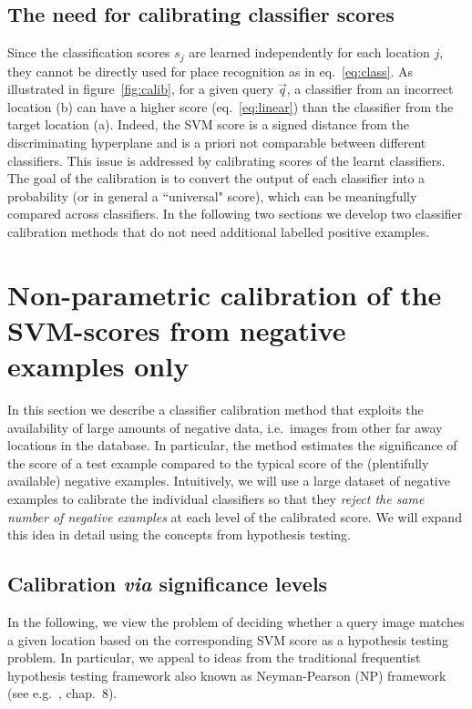   \subsection{The need for calibrating classifier scores}
    Since the classification scores $s_j$ are learned independently for each location $j$, they cannot be directly used for place recognition as in eq.~\eqref{eq:class}. As illustrated in figure~\ref{fig:calib}, for a given query $\vec{q}$, a classifier from an incorrect location (b) can have a higher score \textcolor{petr}{(eq.~\eqref{eq:linear})} than the classifier from the target location (a). Indeed, the SVM score is a signed distance from the discriminating hyperplane and is a priori not comparable between different classifiers. This issue is addressed by calibrating scores of the learnt classifiers. The goal of the calibration is to convert the output of each classifier into a probability (or in general a ``universal" score), which can be meaningfully compared across classifiers. In the following two sections we develop two classifier calibration methods that do not need additional labelled positive examples.
 
\section{Non-parametric calibration of the  SVM-scores from negative examples only}
\label{sec:calibration}

In this section we describe a classifier calibration method that exploits the availability of large amounts of negative data, i.e.\ images from other far away locations in the database.
In particular, the method estimates the significance of the score of a test example compared to the typical score of  the (plentifully available) negative examples. Intuitively, we will use a large dataset of negative examples to calibrate the individual classifiers so that they {\em reject the same number of negative examples} at each level of the calibrated score.   We will expand this idea in detail using the concepts from hypothesis testing. %


   \subsection{Calibration \emph{via} significance levels}
      In the following, we view  the problem of deciding whether a query image matches a given location based on the corresponding SVM score as a hypothesis testing problem. In particular, we appeal to ideas from the traditional frequentist hypothesis testing framework also known as Neyman-Pearson (NP) framework (see e.g.~\cite{casella2001statistical}, chap.~8).

